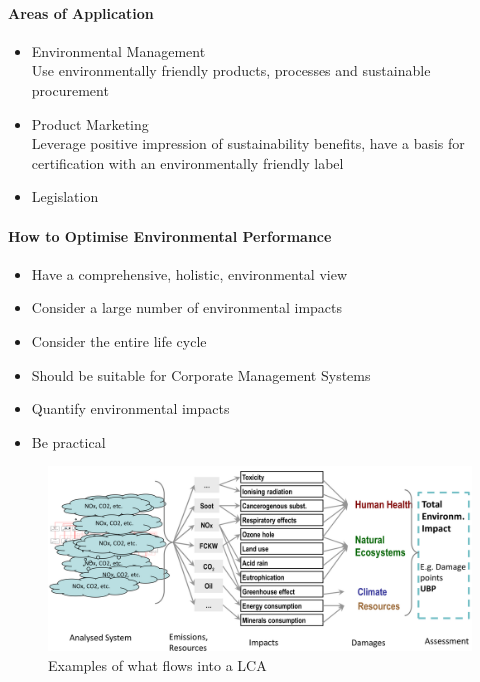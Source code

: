 \documentclass[11pt]{article}
\theoremstyle{definition}
\begin{document}
\paragraph{Areas of Application}
\begin{itemize}
	\item Environmental Management\\
	Use environmentally friendly products, processes and sustainable procurement
	\item Product Marketing\\
	Leverage positive impression of sustainability benefits, have a basis for certification with an environmentally friendly label
	\item Legislation
\end{itemize}

\paragraph{How to Optimise Environmental Performance}
\begin{itemize}
	\item Have a comprehensive, holistic, environmental view
	\item Consider a large number of environmental impacts
	\item Consider the entire life cycle
	\item Should be suitable for Corporate Management Systems
	\item Quantify environmental impacts
	\item Be practical
\end{itemize}

\begin{figure}[H]
	\centering
	\includegraphics[width=0.8\linewidth]{img/life_cycle_assessment.png}
	\caption{Examples of what flows into a LCA}
\end{figure}
\end{document}
